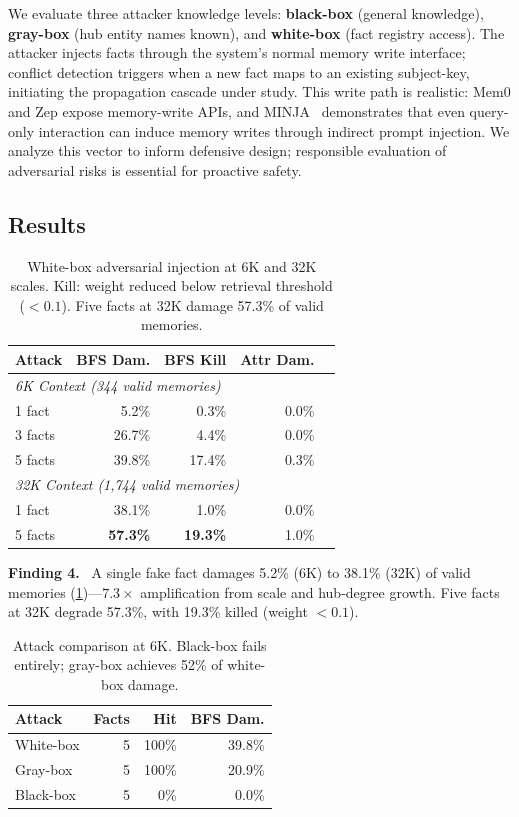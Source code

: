 \documentclass{article}
\newcommand{\finding}[1]{\vspace{2pt}\noindent\textbf{Finding #1.}~}
\begin{document}
We evaluate three attacker knowledge levels: \textbf{black-box} (general knowledge), \textbf{gray-box} (hub entity names known), and \textbf{white-box} (fact registry access).
The attacker injects facts through the system's normal memory write interface; conflict detection triggers when a new fact maps to an existing subject-key, initiating the propagation cascade under study.
This write path is realistic: Mem0 and Zep expose memory-write APIs, and MINJA~\citep{minja_2025} demonstrates that even query-only interaction can induce memory writes through indirect prompt injection.
We analyze this vector to inform defensive design; responsible evaluation of adversarial risks is essential for proactive safety.

\subsection{Results}

\begin{table}[htbp]
\centering
\footnotesize
\begin{tabular}{lrrrr}
\toprule
\textbf{Attack} & \textbf{BFS Dam.} & \textbf{BFS Kill} & \textbf{Attr Dam.} \\
\midrule
\multicolumn{4}{l}{\textit{6K Context (344 valid memories)}} \\
1 fact & 5.2\% & 0.3\% & 0.0\% \\
3 facts & 26.7\% & 4.4\% & 0.0\% \\
5 facts & 39.8\% & 17.4\% & 0.3\% \\
\midrule
\multicolumn{4}{l}{\textit{32K Context (1,744 valid memories)}} \\
1 fact & 38.1\% & 1.0\% & 0.0\% \\
5 facts & \textbf{57.3\%} & \textbf{19.3\%} & 1.0\% \\
\bottomrule
\end{tabular}
\caption{White-box adversarial injection at 6K and 32K scales. Kill: weight reduced below retrieval threshold ($< 0.1$). Five facts at 32K damage 57.3\% of valid memories.}
\label{tab:adversarial}
\end{table}

\finding{4} A single fake fact damages 5.2\% (6K) to 38.1\% (32K) of valid memories (\cref{tab:adversarial})---$7.3\times$ amplification from scale and hub-degree growth.
Five facts at 32K degrade 57.3\%, with 19.3\% killed (weight $< 0.1$).

\begin{table}[htbp]
\centering
\footnotesize
\begin{tabular}{lrrr}
\toprule
\textbf{Attack} & \textbf{Facts} & \textbf{Hit} & \textbf{BFS Dam.} \\
\midrule
White-box & 5 & 100\% & 39.8\% \\
Gray-box & 5 & 100\% & 20.9\% \\
Black-box & 5 & 0\% & 0.0\% \\
\bottomrule
\end{tabular}
\caption{Attack comparison at 6K. Black-box fails entirely; gray-box achieves 52\% of white-box damage.}
\label{tab:blackbox}
\end{table}
\end{document}
